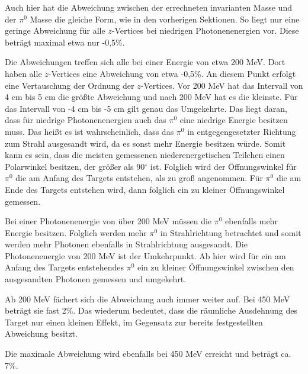\documentclass[a4paper,11pt,oneside,final,german,openbib,pdftex]{scrbook}
\begin{document}
{Auch hier hat die Abweichung zwischen der errechneten invarianten Masse und der $\pi^0$ Masse die gleiche Form, wie in den vorherigen Sektionen. So liegt nur eine geringe Abweichung f\"ur alle $z$-Vertices bei niedrigen Photonenenergien vor. Diese betr\"agt maximal etwa nur -0,5\%. 

Die Abweichungen treffen sich alle bei einer Energie von etwa 200 MeV. Dort haben alle $z$-Vertices eine Abweichung von etwa -0,5\%. An diesem Punkt erfolgt eine Vertauschung der Ordnung der $z$-Vertices. Vor 200 MeV hat das Intervall von 4 cm bis 5 cm die gr\"o{\ss}te Abweichung und nach 200 MeV hat es die kleinste. F\"ur das Intervall von -4 cm bis -5 cm gilt genau das Umgekehrte. Das liegt daran, dass f\"ur niedrige Photonenenergien auch das $\pi^0$ eine niedrige Energie besitzen muss. Das hei{\ss}t es ist wahrscheinlich, dass das $\pi^0$ in entgegengesetzter Richtung zum Strahl ausgesandt wird, da es sonst mehr Energie besitzen w\"urde. Somit kann es sein, dass die meisten gemessenen niederenergetischen Teilchen einen Polarwinkel besitzen, der gr\"o{\ss}er als 90$^{\circ}$ ist. Folglich wird der \"Offnungswinkel f\"ur $\pi^0$ die am Anfang des Targets entstehen, als zu gro{\ss} angenommen. F\"ur $\pi^0$ die am Ende des Targets entstehen wird, dann folglich ein zu kleiner \"Offnungswinkel gemessen. 

Bei einer Photonenenergie von \"uber 200 MeV m\"ussen die $\pi^0$ ebenfalls mehr Energie besitzen. Folglich werden mehr $\pi^0$ in Strahlrichtung betrachtet und somit werden mehr Photonen ebenfalls in Strahlrichtung ausgesandt. Die Photonenenergie von 200 MeV ist der Umkehrpunkt.
Ab hier wird f\"ur ein am Anfang des Targets entstehendes $\pi^0$ ein zu kleiner \"Offnungswinkel zwischen den ausgesandten Photonen gemessen und umgekehrt.

Ab 200 MeV f\"achert sich die Abweichung auch immer weiter auf. Bei 450 MeV betr\"agt sie fast 2\%. Das wiederum bedeutet, dass die r\"aumliche Ausdehnung des Target nur einen kleinen Effekt, im Gegensatz zur bereits festgestellten Abweichung besitzt.

Die maximale Abweichung wird ebenfalls bei 450 MeV erreicht und betr\"agt ca. 7\%.

}
\end{document}
